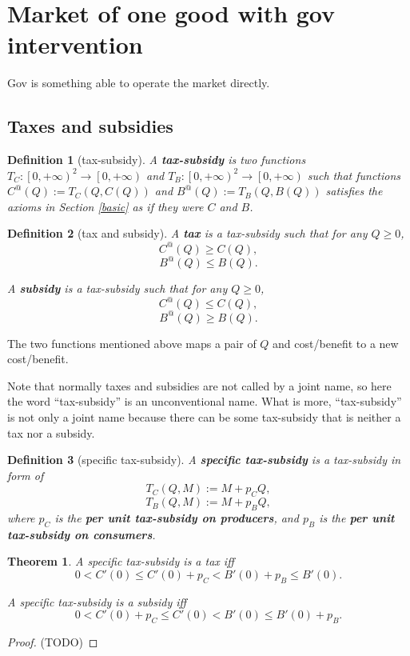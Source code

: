 \documentclass{article}
\newtheorem{theorem}{Theorem}
\newtheorem{definition}{Definition}
\begin{document}
\section{Market of one good with gov intervention}

Gov is something able to operate the market directly.

\subsection{Taxes and subsidies}

\begin{definition}[tax-subsidy]
\label{tax-subsidy}
A \textbf{tax-subsidy} is two functions
$T_C:\left[0,+\infty\right)^2\to\left[0,+\infty\right)$ and
$T_B:\left[0,+\infty\right)^2\to\left[0,+\infty\right)$
such that functions $C^@\left(Q\right):=T_C\left(Q,C\left(Q\right)\right)$
and $B^@\left(Q\right):=T_B\left(Q,B\left(Q\right)\right)$
satisfies the axioms in Section \ref{basic} as if they were $C$ and $B$.
\end{definition}

\begin{definition}[tax and subsidy]
A \textbf{tax} is a tax-subsidy such that for any $Q\ge0$,
$$C^@\left(Q\right)\ge C\left(Q\right),$$
$$B^@\left(Q\right)\le B\left(Q\right).$$

A \textbf{subsidy} is a tax-subsidy such that for any $Q\ge0$,
$$C^@\left(Q\right)\le C\left(Q\right),$$
$$B^@\left(Q\right)\ge B\left(Q\right).$$
\end{definition}

The two functions mentioned above maps a pair of $Q$ and cost/benefit to a new cost/benefit.

Note that normally taxes and subsidies are not called by a joint name,
so here the word ``tax-subsidy'' is an unconventional name.
What is more, ``tax-subsidy'' is not only a joint name
because there can be some tax-subsidy that is neither a tax nor a subsidy.

\begin{definition}[specific tax-subsidy]
\label{specific tax-subsidy}
A \textbf{specific tax-subsidy} is a tax-subsidy in form of
$$T_C\left(Q,M\right):=M+p_CQ,$$
$$T_B\left(Q,M\right):=M+p_BQ,$$
where $p_C$ is the \textbf{per unit tax-subsidy on producers},
and $p_B$ is the \textbf{per unit tax-subsidy on consumers}.
\end{definition}

\begin{theorem}
A specific tax-subsidy is a tax iff
$$0<C'\left(0\right)\le C'\left(0\right)+p_C<B'\left(0\right)+p_B\le B'\left(0\right).$$

A specific tax-subsidy is a subsidy iff
$$0<C'\left(0\right)+p_C\le C'\left(0\right)<B'\left(0\right)\le B'\left(0\right)+p_B.$$
\end{theorem}
\begin{proof}
(TODO) %
\end{proof}
\end{document}
